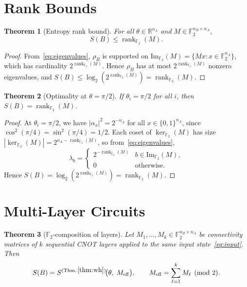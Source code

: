\documentclass[11pt,a4paper]{article}
\newtheorem{theorem}{Theorem}[section]
\newcommand{\F}{\mathbb{F}}
\newcommand{\rk}{\operatorname{rank}_{\F_2}}
\newcommand{\VNE}{S}
\begin{document}
\section{Rank Bounds}
\label{sec:rank}

\begin{theorem}[Entropy rank bound]
\label{thm:rank}
For all $\theta \in \mathbb{R}^{n_A}$ and $M \in \F_2^{n_B \times n_A}$,
\begin{equation}
  \VNE(B) \leq \rk(M).
  \label{eq:rank_bound}
\end{equation}
\end{theorem}

\begin{proof}
From~\eqref{eq:eigenvalues}, $\rho_B$ is supported on
$\mathrm{Im}_{\F_2}(M) = \{Mx : x \in \F_2^{n_A}\}$,
which has cardinality $2^{\rk(M)}$.
Hence $\rho_B$ has at most $2^{\rk(M)}$ nonzero eigenvalues, and
$\VNE(B) \leq \log_2(2^{\rk(M)}) = \rk(M)$.
\end{proof}

\begin{theorem}[Optimality at $\theta = \pi/2$]
\label{thm:opt}
If $\theta_i = \pi/2$ for all $i$, then $\VNE(B) = \rk(M)$.
\end{theorem}

\begin{proof}
At $\theta_i = \pi/2$, we have $|\alpha_x|^2 = 2^{-n_A}$ for all
$x \in \{0,1\}^{n_A}$, since
$\cos^2(\pi/4) = \sin^2(\pi/4) = 1/2$.
Each coset of $\ker_{\F_2}(M)$ has size $|\ker_{\F_2}(M)| = 2^{n_A - \rk(M)}$,
so from~\eqref{eq:eigenvalues},
\begin{equation}
  \lambda_b =
  \begin{cases}
    2^{-\rk(M)} & b \in \mathrm{Im}_{\F_2}(M), \\
    0            & \text{otherwise.}
  \end{cases}
\end{equation}
Hence $\VNE(B) = \log_2(2^{\rk(M)}) = \rk(M)$.
\end{proof}

\section{Multi-Layer Circuits}
\label{sec:layers}

\begin{theorem}[$\F_2$-composition of layers]
\label{thm:layers}
Let $M_1, \ldots, M_k \in \F_2^{n_B \times n_A}$ be connectivity matrices of
$k$ sequential CNOT layers applied to the same input state~\eqref{eq:input}.
Then
\begin{equation}
  \VNE(B) = \VNE^{(\mathrm{Thm.\,\ref{thm:wh}})}\!\bigl(\theta,\; M_{\mathrm{eff}}\bigr),
  \qquad
  M_{\mathrm{eff}} = \sum_{\ell=1}^{k} M_\ell \pmod{2}.
  \label{eq:meff}
\end{equation}
\end{theorem}
\end{document}
